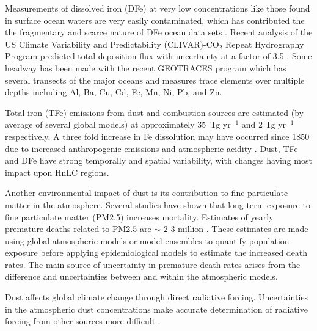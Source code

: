 Measurements of dissolved iron (DFe) at very low concentrations like those found in surface ocean waters are very easily contaminated, which has contributed the the fragmentary and scarce nature of DFe ocean data sets \cite{Rijkenberg_2014}.
Recent analysis of the US Climate Variability and Predictability (CLIVAR)-CO$_{2}$ Repeat Hydrography Program predicted total deposition flux with uncertainty at a factor of 3.5 \cite{Grand_2015}.
Some headway has been made with the recent GEOTRACES program which has several transects of the major oceans and measures trace elements over multiple depths including Al, Ba, Cu, Cd, Fe, Mn, Ni, Pb, and Zn.
  
Total iron (TFe) emissions from dust and combustion sources are estimated (by average of several global models) at approximately 35~Tg yr$^{-1}$ and 2 Tg yr$^{-1}$ respectively. A three fold increase in Fe dissolution may have occurred since 1850 due to increased anthropogenic emissions and atmospheric acidity \cite{Myriokefalitakis_2015}.
Dust, TFe and DFe have strong temporally and spatial variability, with changes having most impact upon HnLC regions.

Another environmental impact of dust is its contribution to fine particulate matter in the atmosphere.
Several studies have shown that long term exposure to fine particulate matter (PM2.5) increases mortality. 
Estimates of yearly premature deaths related to PM2.5 are $\sim$ 2-3 million \cite{Hoek_2013, 19627030, Silva_2013, Lelieveld_2015}.   
These estimates are made using global atmospheric models or model ensembles to quantify population exposure before applying epidemiological models to estimate the increased death rates.
The main source of uncertainty in premature death rates arises from the difference and uncertainties between and within the atmospheric models.

Dust affects global climate change through direct radiative forcing.
Uncertainties in the atmospheric dust concentrations make accurate determination of radiative forcing from other sources more difficult \cite{IPCC_2013_chap8}.